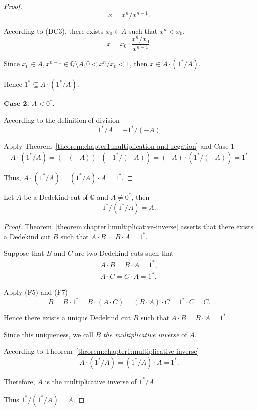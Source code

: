 \begin{proof}
    \[
        x = {x^{n}} / {x^{n-1}}.
    \]

    According to (DC3), there exists $x_{0}\in A$ such that $x^{n} < x_{0}$.
    \[
        x = x_{0}\cdot\frac{x^{n}/x_{0}}{x^{n-1}}.
    \]

    Since $x_{0}\in A, x^{n-1}\in\mathbb{Q}\setminus A, 0 < x^{n}/x_{0} < 1$, then $x\in A\cdot ({1}^{*}/A)$.

    Hence ${1}^{*}\subseteq A\cdot ({1}^{*}/A)$.

    \bigskip
    \textbf{Case 2.} $A < {0}^{*}$.

    According to the definition of division
    \[
        {1}^{*}/A = -{1}^{*}/(-A)
    \]

    Apply Theorem~\ref{theorem:chapter1:multiplication-and-negation} and Case 1
    \[
        A\cdot ({1}^{*}/A) = (-(-A))\cdot (-{1}^{*}/(-A)) = (-A)\cdot ({1}^{*}/(-A)) = {1}^{*}
    \]

    Thus, $A\cdot ({1}^{*}/A) = ({1}^{*}/A)\cdot A = {1}^{*}$.
\end{proof}

\begin{theorem}
    Let $A$ be a Dedekind cut of $\mathbb{Q}$ and $A\ne {0}^{*}$, then
    \[
        {1}^{*}/({1}^{*}/A) = A.
    \]
\end{theorem}

\begin{proof}
    Theorem~\ref{theorem:chapter1:multiplicative-inverse} asserts that there exists a Dedekind cut $B$ such that $A\cdot B = B\cdot A = {1}^{*}$.

    Suppose that $B$ and $C$ are two Dedekind cuts such that
    \[
        \begin{split}
            A\cdot B = B\cdot A = {1}^{*}, \\
            A\cdot C = C\cdot A = {1}^{*}.
        \end{split}
    \]

    Apply (F5) and (F7)
    \[
        B = B\cdot {1}^{*} = B\cdot (A\cdot C) = (B\cdot A)\cdot C = {1}^{*}\cdot C = C.
    \]

    Hence there exists a unique Dedekind cut $B$ such that $A\cdot B = B\cdot A = {1}^{*}$.

    Since this uniqueness, we call $B$ \textit{the multiplicative inverse} of $A$.

    According to Theorem~\ref{theorem:chapter1:multiplicative-inverse}
    \[
        A\cdot ({1}^{*}/A) = ({1}^{*}/A)\cdot A = {1}^{*}.
    \]

    Therefore, $A$ is the multiplicative inverse of ${1}^{*}/A$.

    Thus ${1}^{*}/({1}^{*}/A) = A$.
\end{proof}

